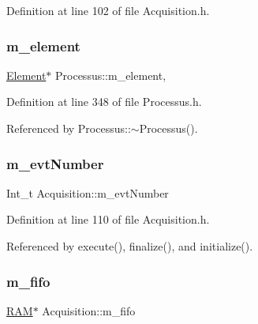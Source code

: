 Definition at line 102 of file Acquisition.\+h.

\mbox{\label{classProcessus_aa9d24d53c3e52f36786cabb5d8e296e7}} 
\subsubsection{\texorpdfstring{m\+\_\+element}{m\_element}}
{\footnotesize\ttfamily \hyperlink{classElement}{Element}$\ast$ Processus\+::m\+\_\+element\hspace{0.3cm}{\ttfamily [protected]}, {\ttfamily [inherited]}}



Definition at line 348 of file Processus.\+h.



Referenced by Processus\+::$\sim$\+Processus().

\mbox{\label{classAcquisition_a32a70daa3f653eae5eafc46dbd0e11a6}} 
\subsubsection{\texorpdfstring{m\+\_\+evt\+Number}{m\_evtNumber}}
{\footnotesize\ttfamily Int\+\_\+t Acquisition\+::m\+\_\+evt\+Number\hspace{0.3cm}{\ttfamily [private]}}



Definition at line 110 of file Acquisition.\+h.



Referenced by execute(), finalize(), and initialize().

\mbox{\label{classAcquisition_a8a893e7485e96da01185df6d1109c0bc}} 
\subsubsection{\texorpdfstring{m\+\_\+fifo}{m\_fifo}}
{\footnotesize\ttfamily \hyperlink{classRAM}{R\+AM}$\ast$ Acquisition\+::m\+\_\+fifo\hspace{0.3cm}{\ttfamily [private]}}



